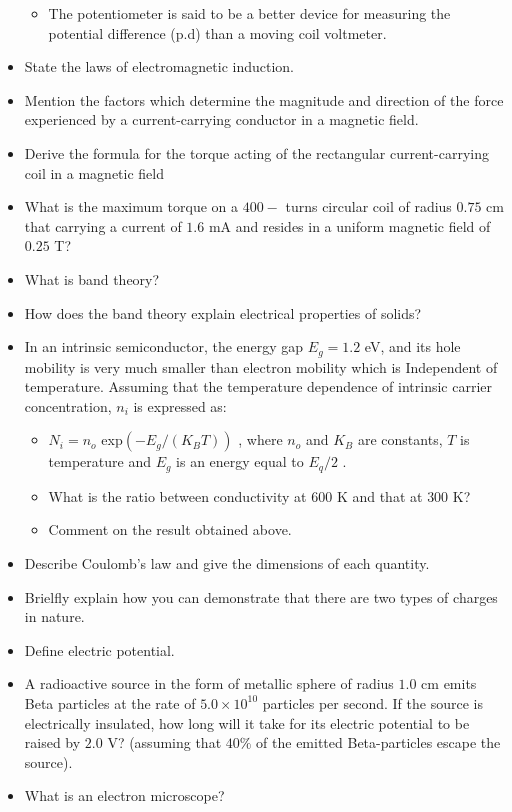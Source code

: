 \documentclass{article}
\begin{document}
\begin{itemize}
\begin{itemize}
\item The potentiometer is said to be a better device for measuring the potential difference (p.d) than a moving coil voltmeter.
\end{itemize}
\item State the laws of electromagnetic induction.
\item Mention the factors which determine the magnitude and direction of the force experienced by a current-carrying conductor in a magnetic field.
\item Derive the formula for the torque acting of the rectangular current-carrying coil in a magnetic field
\item What is the maximum torque on a $ 400-$ turns circular coil of radius $ 0.75$ cm that carrying a current of $ 1.6$ mA and resides in a uniform magnetic field of $ 0.25$ T?
\item What is band theory?
\item How does the band theory explain electrical properties of solids?
\item In an intrinsic semiconductor, the energy gap $ E_{g}=1.2$ eV, and its hole mobility is very much smaller than electron mobility which is Independent of temperature. Assuming that the temperature dependence of intrinsic carrier concentration, $ n_{i}$ is expressed as:
 \begin{itemize}
\item $ N_{i}=n_{o}$ exp$ (-E_{g}/(K_{B}T))$ , where $ n_{o}$ and $ K_{B}$ are constants, $ T$ is temperature and $ E_{g}$ is an energy equal to $ E_{q}/2$ .  
\item What is the ratio between conductivity at $ 600$ K and that at $ 300$ K?
\item Comment on the result obtained above.
\end{itemize}
\item Describe Coulomb’s law and give the dimensions of each quantity.
\item Brielfly explain how you can demonstrate that there are two types of charges in nature.
\item Define electric potential.
\item A radioactive source in the form of metallic sphere of radius $ 1.0$ cm emits Beta particles at the rate of $ 5.0 \times 10^{10}$ particles per second.  If the source is electrically insulated, how long will it take for its electric potential to be raised by $ 2.0$ V? (assuming that $ 40\%$ of the emitted Beta-particles escape the source).
\item What is an electron microscope? 

\end{itemize}
\end{document}
